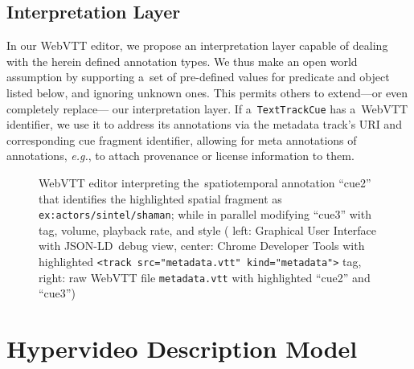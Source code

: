 \documentclass[runningheads,a4paper]{llncs}
\def\JSONLD{\mbox{JSON-LD}}
\def\JSONLD{\mbox{JSON-LD}}
\begin{document}
\subsection{Interpretation Layer}

In our WebVTT editor,
we propose an interpretation layer
capable of dealing with the herein defined annotation types. 
We thus make an open world assumption
by supporting a~set of pre-defined values for predicate and object
listed below, and ignoring unknown ones.
This permits others to extend---or even completely replace---%
our interpretation layer.
If a~\texttt{TextTrackCue} has a~WebVTT identifier,
we use it to address its annotations
via the metadata track's URI
and corresponding cue fragment identifier,
allowing for meta annotations of annotations, \emph{e.g.},
to attach provenance or license information to them.

\begin{figure}[hbt]
  \centering
  \caption{WebVTT editor interpreting the~spatiotemporal annotation ``cue2''
    that identifies the highlighted spatial fragment as \texttt{ex:actors/sintel/shaman};
    while in parallel modifying ``cue3'' with tag, volume, playback rate,
    and style ( left: Graphical User Interface with \JSONLD\ debug view,
   center: Chrome Developer Tools with highlighted
  \texttt{<track src="metadata.vtt" kind="metadata">} tag,
   right: raw WebVTT file \texttt{metadata.vtt} with highlighted ``cue2'' and ``cue3'')}
  \label{fig:webvtt-editor}
\end{figure}

\section{Hypervideo Description Model}
\end{document}
